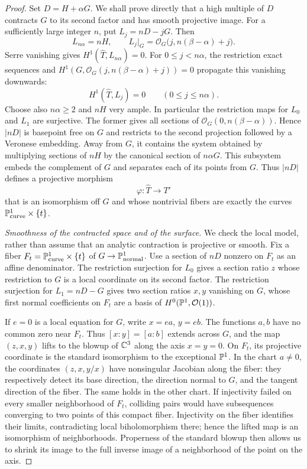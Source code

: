 \begin{proof}
Set $D=H+\alpha G$.  We shall prove directly that a high multiple of
$D$ contracts $G$ to its second factor and has smooth projective image.
For a sufficiently large integer $n$, put
$L_j=nD-jG$.  Then
\[
 L_{n\alpha}=nH,
 \qquad L_j|_G=\mathcal O_G\bigl(j,n(\beta-\alpha)+j\bigr).
\]
Serre vanishing gives $H^1(\widehat T,L_{n\alpha})=0$.
For $0\le j<n\alpha$, the restriction exact sequences and
$H^1(G,\mathcal O_G(j,n(\beta-\alpha)+j))=0$ propagate this
vanishing downwards:
\begin{equation}\label{proj:vanishing}
 H^1(\widehat T,L_j)=0\qquad(0\le j\le n\alpha).
\end{equation}
Choose also $n\alpha\ge2$ and $nH$ very ample.  In particular the
restriction maps for $L_0$ and $L_1$ are surjective.  The former gives
all sections of $\mathcal O_G(0,n(\beta-\alpha))$.  Hence $|nD|$ is
basepoint free on $G$ and restricts to the second projection followed
by a Veronese embedding.  Away from $G$, it contains the system
obtained by multiplying sections of $nH$ by the canonical section of
$n\alpha G$.  This subsystem embeds the complement of $G$ and
separates each of its points from $G$.  Thus $|nD|$ defines a projective
morphism
\[
 \varphi:\widehat T\longrightarrow T'
\]
that is an isomorphism off $G$ and whose nontrivial fibers are exactly
the curves $\mathbb P^1_{\mathrm{curve}}\times\{t\}$.

\smallskip
\noindent\emph{Smoothness of the contracted space and of the surface.}
We check the local model, rather than assume that an analytic
contraction is projective or smooth.  Fix a fiber
$F_t=\mathbb P^1_{\mathrm{curve}}\times\{t\}$ of $G\to\mathbb P^1_{\mathrm{normal}}$.
Use a section of $nD$ nonzero on $F_t$ as an affine denominator.
The restriction surjection for $L_0$ gives a section ratio $z$ whose
restriction to $G$ is a local coordinate on its second factor.
The restriction surjection for $L_1=nD-G$ gives two section ratios
$x,y$ vanishing on $G$, whose first normal coefficients on $F_t$ are
a basis of $H^0(\mathbb P^1,\mathcal O(1))$.

If $e=0$ is a local equation for $G$, write $x=ea$, $y=eb$.
The functions $a,b$ have no common zero near $F_t$.  Thus
$[x:y]=[a:b]$ extends across $G$, and the map $(z,x,y)$ lifts to the
blowup of $\mathbb C^3$ along the axis $x=y=0$.  On $F_t$, its projective
coordinate is the standard isomorphism to the exceptional $\mathbb P^1$.
In the chart $a\ne0$, the coordinates $(z,x,y/x)$ have nonsingular
Jacobian along the fiber: they respectively detect its base direction,
the direction normal to $G$, and the tangent direction of the fiber.
The same holds in the other chart.  If injectivity failed on every
smaller neighborhood of $F_t$, colliding pairs would have subsequences
converging to two points of this compact fiber.  Injectivity on the fiber
identifies their limits, contradicting local biholomorphism there; hence
the lifted map is an isomorphism of neighborhoods.  Properness of the
standard blowup then allows us to shrink its image to the full inverse
image of a neighborhood of the point on the axis.


\end{proof}
